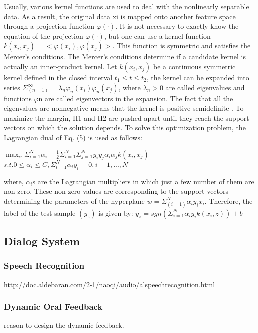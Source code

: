 Usually, various kernel functions are used to deal with the nonlinearly separable data. 
As a result, the original data xi is mapped onto another feature space through a 
projection function ${\varphi(\cdot)}$. It is not necessary to exactly know the equation of the 
projection ${\varphi(\cdot)}$, but one can use a kernel function ${k(x_i,x_j)=<\varphi(x_i),\varphi(x_j)>}$. 
This function is symmetric and satisfies the Mercer’s conditions. The Mercer’s conditions determine 
if a candidate kernel is actually an inner-product kernel. Let ${k(x_i,x_j)}$ be a continuous 
symmetric kernel defined in the closed interval ${t_1\leq t\leq t_2}$, the kernel can be expanded 
into series ${\Sigma_(n=1)^\infty = \lambda_n\varphi_n(x_i)\varphi_n(x_j)}$, where 
${\lambda_n > 0}$ are called eigenvalues and functions $\varphi$n are called eigenvectors in the expansion. 
The fact that all the eigenvalues are nonnegative means that the kernel is positive 
semidefinite \cite{SupportVector1995}. 
To maximize the margin, H1 and H2 are pushed apart until they reach the support vectors 
on which the solution depends. To solve this optimization problem, the Lagrangian dual 
of Eq. (5) is used as follows:

$\max_\alpha \Sigma_{i=1}^{N} \alpha_i - \frac{1}{2} \Sigma_{i=1}^{N} \Sigma_{j=1}^{N} y_i y_j \alpha_i \alpha_j k(x_i, x_j)$\newline
$s.t. 0 \le \alpha_i \le C, \Sigma_{i=1}^{N} \alpha_i y_i = 0, i = 1, ..., N$\newline

where, ${\alpha_i}$s are the Lagrangian multipliers in which just a few number of them are 
non-zero. These non-zero values are corresponding to the support vectors determining 
the parameters of the hyperplane ${w = \Sigma_(i=1)^N\alpha_iy_ix_i }$. Therefore, the label 
of the test sample ${(y_z)}$ is given by:
$y_z = sgn(\Sigma_{i=1}^{N} \alpha_i y_i k(x_i, z)) + b$\newline

\subsection{Dialog System}

\subsubsection{Speech Recognition}
http://doc.aldebaran.com/2-1/naoqi/audio/alspeechrecognition.html

\subsubsection{Dynamic Oral Feedback}
reason to design the dynamic feedback. 

\